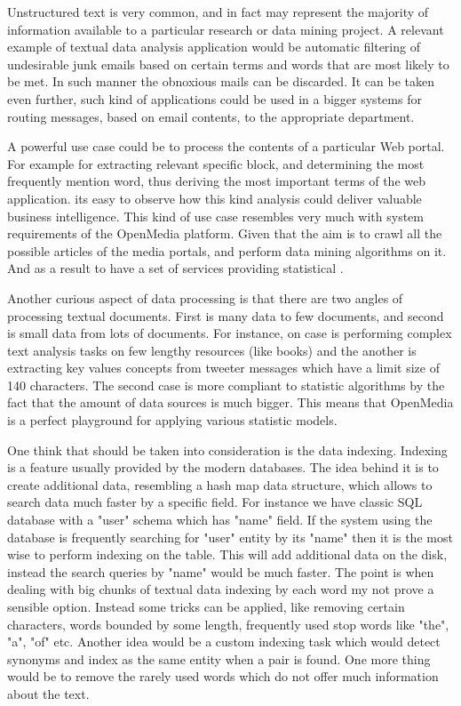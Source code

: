 Unstructured text is very common, and in fact may represent the majority of information available to a particular research or data mining project. A relevant example of textual data analysis application would be automatic filtering of undesirable junk emails based on certain terms and words that are most likely to be met. In such manner the obnoxious mails can be discarded. It can be taken even further, such kind of applications could be used in a bigger systems for routing messages, based on email contents, to the appropriate department.

A powerful use case could be to process the contents of a particular Web portal. For example for extracting relevant specific block, and determining the most frequently mention word, thus deriving the most important terms of the web application. its easy to observe how this kind analysis could deliver valuable business intelligence. This kind of use case resembles very much with system requirements of the OpenMedia platform. Given that the aim is to crawl all the possible articles of the media portals, and perform data mining algorithms on it. And as a result to have a set of services providing statistical .

Another curious aspect of data processing is that there are two angles of processing textual documents. First is many data to few documents, and second is small data from lots of documents. For instance, on case is performing complex text analysis tasks on few lengthy resources (like books) and the another is extracting key values concepts from tweeter messages which have a limit size of 140 characters. The second case is more compliant to statistic algorithms by the fact that the amount of data sources is much bigger. This means that OpenMedia is a perfect playground for applying various statistic models.

One think that should be taken into consideration is the data indexing. Indexing is a feature usually provided by the modern databases. The idea behind it is to create additional data, resembling a hash map data structure, which allows to search data much faster by a specific field. For instance we have classic SQL database with a "user" schema which has "name" field. If the system using the database is frequently searching for "user" entity by its "name" then it is the most wise to perform indexing on the table. This will add additional data on the disk, instead the search queries by "name" would be much faster. The point is when dealing with big chunks of textual data indexing by each word my not prove a sensible option. Instead some tricks can be applied, like removing certain characters, words bounded by some length, frequently used stop words like "the", "a", "of" etc. Another idea would be a custom indexing task which would detect synonyms and index as the same entity when a pair is found. One more thing would be to remove the rarely used words which do not offer much information about the text.

